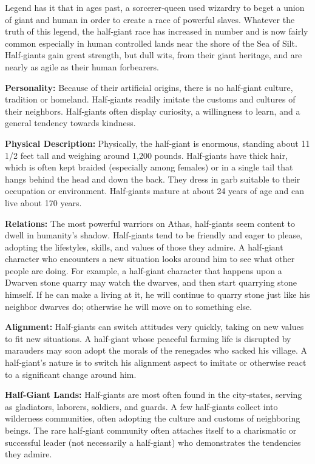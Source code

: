 \documentclass[10pt,a4paper,twocolumn]{d20}
\begin{document}
Legend has it that in ages past, a sorcerer‐queen used wizardry to beget a union of giant and human in order to create a race of powerful slaves. Whatever the truth of this legend, the half‐giant race has increased in number and is now fairly common especially in human controlled lands near the shore of the Sea of Silt. Half‐giants gain great strength, but dull wits, from their giant heritage, and are nearly as agile as their human forbearers.

\textbf{Personality:} Because of their artificial origins, there is no half‐giant culture, tradition or homeland. Half‐giants readily imitate the customs and cultures of their neighbors. Half‐giants often display curiosity, a willingness to learn, and a general tendency towards kindness.

\textbf{Physical Description:} Physically, the half‐giant is enormous, standing about 11 1/2 feet tall and weighing around 1,200 pounds. Half‐giants have thick hair, which is often kept braided (especially among females) or in a single tail that hangs behind the head and down the back. They dress in garb suitable to their occupation or environment. Half‐giants mature at about 24 years of age and can live about 170 years.

\textbf{Relations:} The most powerful warriors on Athas, half‐giants seem content to dwell in humanity’s shadow. Half‐giants tend to be friendly and eager to please, adopting the lifestyles, skills, and values of those they admire. A half‐giant character who encounters a new situation looks around him to see what other people are doing. For example, a half‐giant character that happens upon a Dwarven stone quarry may watch the dwarves, and then start quarrying stone himself. If he can make a living at it, he will continue to quarry stone just like his neighbor dwarves do; otherwise he will move on to something else.

\textbf{Alignment:} Half‐giants can switch attitudes very quickly, taking on new values to fit new situations. A half‐giant whose peaceful farming life is disrupted by marauders may soon adopt the morals of the renegades who sacked his village. A half‐giant’s nature is to switch his alignment aspect to imitate or otherwise react to a significant change around him.

\textbf{Half‐Giant Lands:} Half‐giants are most often found in the city‐states, serving as gladiators, laborers, soldiers, and guards. A few half‐giants collect into wilderness communities, often adopting the culture and customs of neighboring beings. The rare half‐giant community often attaches itself to a charismatic or successful leader (not necessarily a half‐giant) who demonstrates the tendencies they admire.
\end{document}
